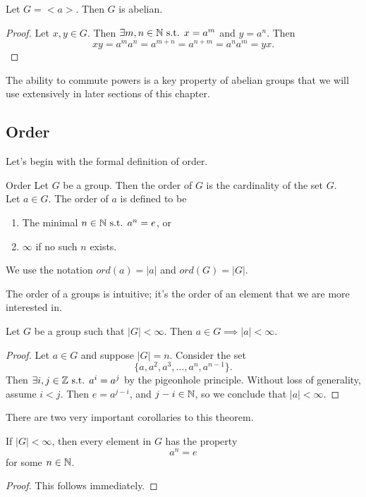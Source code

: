 \begin{theorem}{}
    Let $G=<a>$. Then $G$ is abelian.
\end{theorem}
\begin{proof}
    Let $x,y\in G$. Then $\exists m,n\in\mathbb{N}\text{ s.t. } x=a^{m}$ and $y=a^{n}$. Then
    \[
        xy=a^{m}a^{n}=a^{m+n}=a^{n+m}=a^{n}a^{m}=yx.
    \]
\end{proof}
The ability to commute powers is a key property of abelian groups that we will use extensively in later sections of this chapter.

\subsection*{Order}
Let's begin with the formal definition of order.

\begin{definition}{Order}
    Let $G$ be a group. Then the order of $G$ is the cardinality of the set $G$.\\
    Let $a\in G$. The order of $a$ is defined to be
    \begin{enumerate}
        \item The minimal $n\in\mathbb{N}\text{ s.t. } a^{n}=e$, or
        \item $\infty$ if no such $n$ exists.
    \end{enumerate}
    We use the notation $ord(a)=|a|$ and $ord(G)=|G|$.
\end{definition}

The order of a groups is intuitive; it's the order of an element that we are more interested in.

\begin{theorem}{}
    Let $G$ be a group such that $|G|<\infty$. Then $a\in G\implies |a|<\infty$.
\end{theorem}
\begin{proof}
    Let $a\in G$ and suppose $|G|=n$. Consider the set
    \[
        \{a,a^{2},a^{3},\dots,a^{n},a^{n-1}\}.
    \]
    Then $\exists i,j\in\mathbb{Z}\text{ s.t. } a^{i}=a^{j}$ by the pigeonhole principle. Without loss of generality, assume $i<j$. Then $e=a^{j-i}$, and $j-i\in\mathbb{N}$, so we conclude that $|a|<\infty$.
\end{proof}
There are two very important corollaries to this theorem.
\begin{corollary}
    If $|G|<\infty$, then every element in $G$ has the property
    \[
        a^{n}=e
    \]
    for some $n\in\mathbb{N}$.
\end{corollary}
\begin{proof}
    This follows immediately.
\end{proof}

